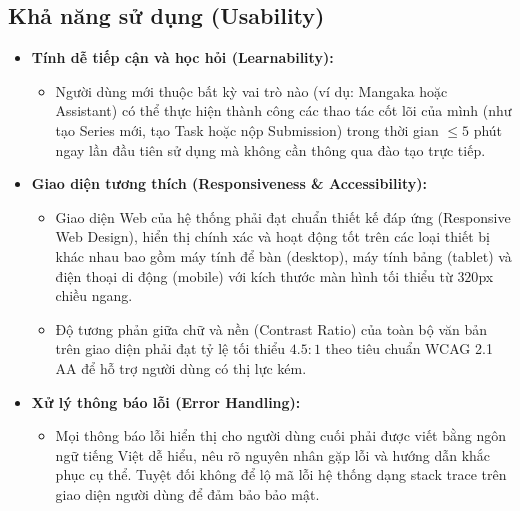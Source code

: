 \subsection{Khả năng sử dụng (Usability)}
\label{subsec:nfr_usability}
\begin{itemize}
    \item \textbf{Tính dễ tiếp cận và học hỏi (Learnability):}
    \begin{itemize}
        \item Người dùng mới thuộc bất kỳ vai trò nào (ví dụ: Mangaka hoặc Assistant) có thể thực hiện thành công các thao tác cốt lõi của mình (như tạo Series mới, tạo Task hoặc nộp Submission) trong thời gian $\le 5$ phút ngay lần đầu tiên sử dụng mà không cần thông qua đào tạo trực tiếp.
    \end{itemize}
    \item \textbf{Giao diện tương thích (Responsiveness \& Accessibility):}
    \begin{itemize}
        \item Giao diện Web của hệ thống phải đạt chuẩn thiết kế đáp ứng (Responsive Web Design), hiển thị chính xác và hoạt động tốt trên các loại thiết bị khác nhau bao gồm máy tính để bàn (desktop), máy tính bảng (tablet) và điện thoại di động (mobile) với kích thước màn hình tối thiểu từ $320$px chiều ngang.
        \item Độ tương phản giữa chữ và nền (Contrast Ratio) của toàn bộ văn bản trên giao diện phải đạt tỷ lệ tối thiểu $4.5:1$ theo tiêu chuẩn WCAG 2.1 AA để hỗ trợ người dùng có thị lực kém.
    \end{itemize}
    \item \textbf{Xử lý thông báo lỗi (Error Handling):}
    \begin{itemize}
        \item Mọi thông báo lỗi hiển thị cho người dùng cuối phải được viết bằng ngôn ngữ tiếng Việt dễ hiểu, nêu rõ nguyên nhân gặp lỗi và hướng dẫn khắc phục cụ thể. Tuyệt đối không để lộ mã lỗi hệ thống dạng stack trace trên giao diện người dùng để đảm bảo bảo mật.
    \end{itemize}
\end{itemize}


